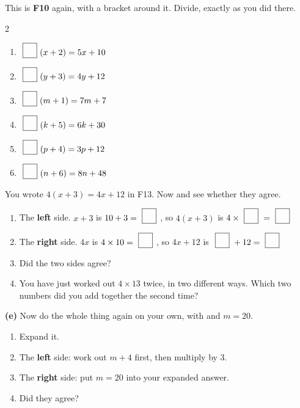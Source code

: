 \documentclass[12pt,a4paper]{article}
\newcommand{\nbox}{\ \fbox{\rule{0pt}{1.05em}\rule{1.0em}{0pt}}\ }
\begin{document}
\noindent This is \textbf{F10} again, with a bracket around it. Divide, exactly as you
did there.

\vspace{4pt}
\begin{multicols}{2}
\begin{enumerate}[label=(\alph*), itemsep=13pt]
  \item $\nbox (x + 2) = 5x + 10$
  \item $\nbox (y + 3) = 4y + 12$
  \item $\nbox (m + 1) = 7m + 7$
  \item $\nbox (k + 5) = 6k + 30$
  \item $\nbox (p + 4) = 3p + 12$
  \item $\nbox (n + 6) = 8n + 48$
\end{enumerate}
\end{multicols}


\begin{yourturn}
  You wrote \; $4(x + 3) = 4x + 12$ \; in F13. Now  and see whether they agree.
\end{yourturn}

\vspace{2pt}
\begin{enumerate}[label=(\alph*), itemsep=11pt]
  \item The \textbf{left} side. \quad $x + 3$ is $10 + 3 = \nbox$, \; so
        $4(x+3)$ is $4 \times \nbox = \nbox$
  \item The \textbf{right} side. \quad $4x$ is $4 \times 10 = \nbox$, \; so
        $4x + 12$ is $\nbox + 12 = \nbox$
  \item Did the two sides agree? \hfill \blank[3.0cm]
  \item You have just worked out $4 \times 13$ twice, in two different ways. Which
        two numbers did you add together the second time?
        \hfill \blank[4.0cm]
\end{enumerate}

\vspace{7pt}
\noindent \textbf{(e)} Now do the whole thing again on your own, with
\;  \; and \; $m = 20$.

\vspace{4pt}
\begin{enumerate}[label=(\roman*), itemsep=9pt]
  \item Expand it. \hfill \blank[4.4cm]
  \item The \textbf{left} side: work out $m + 4$ first, then multiply by 3.
        \hfill \blank[4.4cm]
  \item The \textbf{right} side: put $m = 20$ into your expanded answer.
        \hfill \blank[4.4cm]
  \item Did they agree? \hfill \blank[4.4cm]
\end{enumerate}
\end{document}
